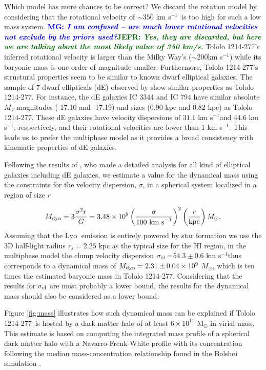 \documentclass[a4,useAMS,usenatbib,usegraphicx]{mn2e}
\newcommand{\tol}{Tololo 1214-277}
\newcommand{\lya}{\ifmmode{{\rm Ly}\alpha}\else Ly$\alpha$\ \fi}
\newcommand{\kms}{km s$^{-1}$}
\newcommand{\sigmaclump}{$54.3\pm 0.6$ km s$^{-1}$}
\newcommand{\mg}[1]{\textcolor{blue}{\bf MG: \textit{#1}}}
\newcommand{\jefr}[1]{\textcolor{darkgreen}{\bf JEFR: \textit{#1}}}
\begin{document}
Which model has more
chances to be correct?  
We discard the rotation model by considering that the rotational
velocity of $\sim350$ \kms\ is too high for such a low
mass system.  \mg{I am confused -- are much lower rotational
  velocities not exclude by the priors used?}\jefr{Yes, they are
  discarded, but here we are talking about the most likely value of
  350 km/s.}
\tol's inferred rotational velocity is larger than the
Milky Way's ($\sim200$\kms) while its baryonic mass is one order
of magnitude smaller. 
Furthermore, \tol's structural properties seem to be similar to known dwarf
elliptical galaxies. 
The sample of 7 dwarf ellipticals (dE) observed by
\cite{2003AJ....126.1794G} show similar properties as \tol. 
For instance, the dE galaxies IC 3344 and IC 794 have similar absolute $M_V$
magnitudes (-17.10 and -17.19) and sizes (0.90 kpc and 0.82 kpc) as
\tol. 
These dE galaxies have velocity dispersions of $31.1$ \kms and
$44.6$ \kms, respectively,  and their rotational velocities are lower
than $1$ \kms.  
This leads us to prefer the multiphase model as it provides 
a broad consistency with kinematic properties of dE galaxies.

 
Following the results of \cite{2011ApJ...726..108T}, who made a
detailed analysis for all kind of elliptical galaxies including dE galaxies, we
estimate a value for the dynamical mass using the constraints for
the velocity dispersion, $\sigma$,  in a spherical system localized in a
region of size $r$   


\begin{equation}
M_{\rm dyn} = 3 \frac{\sigma ^{2}r}{G} = 3.48\times10^{9}
\left(\frac{\sigma}{100\ \mathrm{km\ s}^{-1}}\right)^2\left(\frac{r}{\mathrm{kpc}}\right)
M_{\odot}, 
\end{equation}
%
Assuming that the \lya emission is entirely powered by star formation 
we use the 3D half-light radius $r_s=2.25$ kpc as the typical size
for the HI region, in the multiphase model the clump velocity dispersion
$\sigma_{\rm{cl}}=$\sigmaclump thus corresponds to a dynamical mass of
$M_{\rm dyn}=2.31\pm0.04 \times 10^{9}$ $M_{\odot}$, which is ten
times the estimated baryonic mass in \tol.
Considering that the results for $\sigma_{\rm{cl}}$ are most probably
a lower bound, the results for the dynamical mass should also be
considered as a lower bound. 

Figure \ref{fig:mass} illustrates  how such dynamical
mass can be explained if \tol\ is hosted by a dark matter halo of at
least $6\times 10^{11}$ M$_{\odot}$ in virial mass. 
This estimate is based on computing the integrated mass profile of a
spherical dark matter halo with a Navarro-Frenk-White profile with its
concentration following the median mass-concentration
relationship found in the Bolshoi simulation
\citep{2012MNRAS.423.3018P,2016ApJ...832..169P}.  
\end{document}
